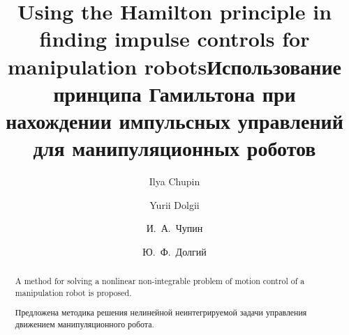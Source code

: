 \begin{englishtitle}
\title{Using the Hamilton principle in finding impulse controls for manipulation robots}
\author{Ilya Chupin \and Yurii Dolgii}

\maketitle

\begin{abstract}
A method for solving a nonlinear non-integrable problem of motion control of a manipulation robot is proposed.

\end{abstract}
\end{englishtitle}

\iffalse
\documentclass[12pt]{llncs}
\usepackage[T2A]{fontenc}
\usepackage[utf8]{inputenc}
\usepackage[english,russian]{babel}
\usepackage[russian]{nla}




\fi

\title{Использование принципа Гамильтона при нахождении импульсных управлений для манипуляционных роботов}
\author{И.~А.~Чупин  \and  Ю.~Ф.~Долгий
  \and
} %

\maketitle

\begin{abstract}
Предложена методика решения нелинейной неинтегрируемой задачи управления движением манипуляционного робота.

\end{abstract}

